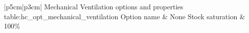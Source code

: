 \begin{customLongTable}{ |p{5cm}|p{3cm}| }
{Mechanical Ventilation options and properties} {table:hc_opt_mechanical_ventilation}
{Option name & None}
\endhead
\hline
Stock saturation & 100\% \\ \hline
\end{customLongTable}

